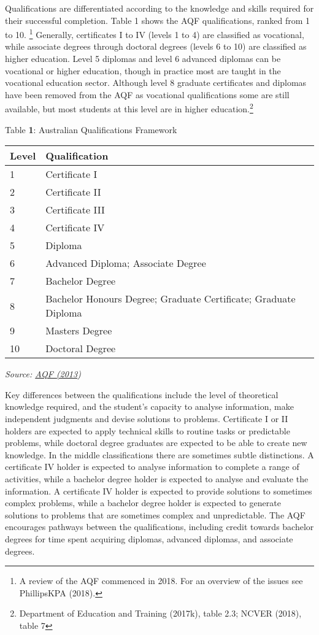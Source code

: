 \documentclass[]{book}
\begin{document}
Qualifications are differentiated according to the knowledge and skills required for their successful completion. Table 1 shows the AQF qualifications, ranked from 1 to 10. \footnote{A review of the AQF commenced in 2018. For an overview of the issues see PhillipsKPA (2018).} Generally, certificates I to IV (levels 1 to 4) are classified as vocational, while associate degrees through doctoral degrees (levels 6 to 10) are classified as higher education. Level 5 diplomas and level 6 advanced diplomas can be vocational or higher education, though in practice most are taught in the vocational education sector. Although level 8 graduate certificates and diplomas have been removed from the AQF as vocational qualifications some are still available, but most students at this level are in higher education.\footnote{Department of Education and Training (2017k), table 2.3; NCVER (2018), table 7}

\protect\hypertarget{_Ref217526032}{}{}Table \textbf{1}: Australian Qualifications Framework

\begin{longtable}[]{@{}ll@{}}
\toprule
\textbf{Level} & \textbf{Qualification}\tabularnewline
\midrule
\endhead
1 & Certificate I\tabularnewline
2 & Certificate II\tabularnewline
3 & Certificate III\tabularnewline
4 & Certificate IV\tabularnewline
5 & Diploma\tabularnewline
6 & Advanced Diploma; Associate Degree\tabularnewline
7 & Bachelor Degree\tabularnewline
8 & Bachelor Honours Degree; Graduate Certificate; Graduate Diploma\tabularnewline
9 & Masters Degree\tabularnewline
10 & Doctoral Degree\tabularnewline
\bottomrule
\end{longtable}

\emph{Source: \protect\hyperlink{_ENREF_20}{AQF (2013})}

Key differences between the qualifications include the level of theoretical knowledge required, and the student's capacity to analyse information, make independent judgments and devise solutions to problems. Certificate I or II holders are expected to apply technical skills to routine tasks or predictable problems, while doctoral degree graduates are expected to be able to create new knowledge. In the middle classifications there are sometimes subtle distinctions. A certificate IV holder is expected to analyse information to complete a range of activities, while a bachelor degree holder is expected to analyse and evaluate the information. A certificate IV holder is expected to provide solutions to sometimes complex problems, while a bachelor degree holder is expected to generate solutions to problems that are sometimes complex and unpredictable. The AQF encourages pathways between the qualifications, including credit towards bachelor degrees for time spent acquiring diplomas, advanced diplomas, and associate degrees.
\end{document}
